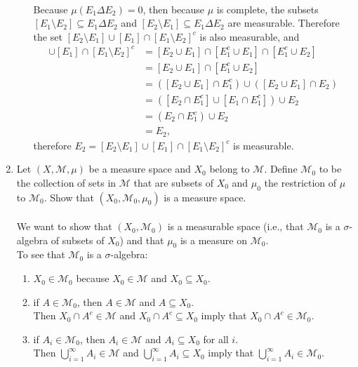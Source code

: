 \begin{enumerate}
\begin{enumerate}[label=(\roman*),align=left]
		\\Because $\mu(E_1\Delta E_2)=0$, then because $\mu$ is complete, the subsets $[E_1\setminus E_2]\subseteq E_1\Delta E_2$ and $[E_2\setminus E_1]\subseteq E_1\Delta E_2$ are measurable.
		Therefore the set $[E_2\setminus E_1]\cup[E_1]\cap[E_1\setminus E_2]^c$ is also measurable, and
		\begin{align*}
			[E_2\setminus E_1]\cup[E_1]\cap[E_1\setminus E_2]^c&=[E_2\cup E_1]\cap[E_1^c\cup E_1]\cap[E_1^c\cup E_2]\\
			&=[E_2\cup E_1]\cap[E_1^c\cup E_2]\\
			&=([E_2\cup E_1]\cap E_1^c)\cup ([E_2\cup E_1]\cap E_2)\\
			&=([E_2\cap E_1^c]\cup [E_1\cap E_1^c])\cup E_2\\
			&=(E_2\cap E_1^c)\cup E_2\\
			&=E_2,
		\end{align*}
		therefore $E_2=[E_2\setminus E_1]\cup[E_1]\cap[E_1\setminus E_2]^c$ is measurable.
	\end{enumerate}
	\item Let $(X,\mathcal{M},\mu)$ be a measure space and $X_0$ belong to $\mathcal{M}$.
	Define $\mathcal{M}_0$ to be the collection of sets in $\mathcal{M}$ that are subsets of $X_0$ and $\mu_0$ the restriction of $\mu$ to $\mathcal{M}_0$.
	Show that $(X_0,\mathcal{M}_0,\mu_0)$ is a measure space.\\
	\\We want to show that $(X_0,\mathcal{M}_0)$ is a measurable space (i.e., that $\mathcal{M}_0$ is a $\sigma$-algebra of subsets of $X_0$) and that $\mu_0$ is a measure on $\mathcal{M}_0$.
	\\To see that $\mathcal{M}_0$ is a $\sigma$-algebra:
	\begin{enumerate}[label=(\roman*),align=left]   
		\item $X_0\in\mathcal{M}_0$ because $X_0\in\mathcal{M}$ and $X_0\subseteq X_0$.
		\item if $A\in\mathcal{M}_0$, then $A\in\mathcal{M}$ and $A\subseteq X_0$.\\
		Then $X_0\cap A^c\in\mathcal{M}$ and $X_0\cap A^c\subseteq X_0$ imply that $X_0\cap A^c\in\mathcal{M}_0$.
		\item if $A_i\in\mathcal{M}_0$, then $A_i\in\mathcal{M}$ and $A_i\subseteq X_0$ for all $i$.\\
		Then $\bigcup_{i=1}^\infty A_i\in\mathcal{M}$ and $\bigcup_{i=1}^\infty A_i\subseteq X_0$ imply that $\bigcup_{i=1}^\infty A_i\in\mathcal{M}_0$.
	\end{enumerate}

\end{enumerate}

